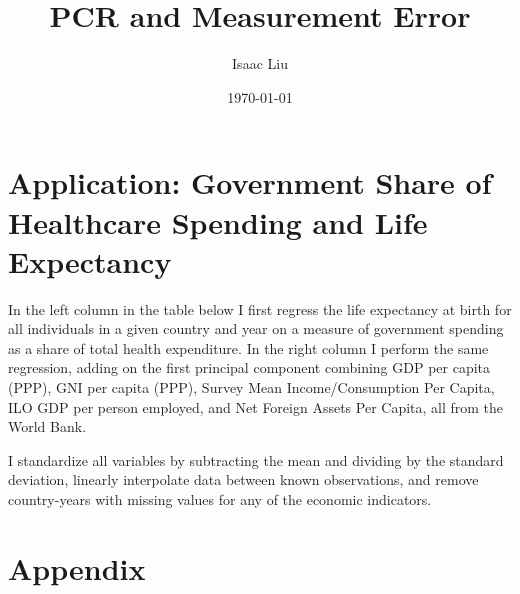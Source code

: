 \documentclass{report}
\title{PCR and Measurement Error}
\author{Isaac Liu}
\date{\today}
\begin{document}
	\maketitle

	\newpage \clearpage

    \section*{Application: Government Share of Healthcare Spending and Life Expectancy}

	In the left column in the table below I first regress the life expectancy at birth for all individuals in a given country and year on a measure of government spending as a share of total health expenditure. In the right column I perform the same regression, adding on the first principal component combining GDP per capita (PPP), GNI per capita (PPP), Survey Mean Income/Consumption Per Capita, ILO GDP per person employed, and Net Foreign Assets Per Capita, all from the World Bank.
	
	I standardize all variables by subtracting the mean and dividing by the standard deviation, linearly interpolate data between known observations, and remove country-years with missing values for any of the economic indicators.

    



	

    \clearpage \newpage

    \appendix

    \section*{Appendix}
\end{document}
